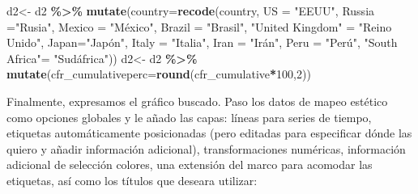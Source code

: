\documentclass[
]{article}
\newenvironment{Shaded}{\begin{snugshade}}{\end{snugshade}}
\newcommand{\AttributeTok}[1]{\textcolor[rgb]{0.13,0.29,0.53}{#1}}
\newcommand{\DecValTok}[1]{\textcolor[rgb]{0.00,0.00,0.81}{#1}}
\newcommand{\FunctionTok}[1]{\textcolor[rgb]{0.13,0.29,0.53}{\textbf{#1}}}
\newcommand{\NormalTok}[1]{#1}
\newcommand{\OtherTok}[1]{\textcolor[rgb]{0.56,0.35,0.01}{#1}}
\newcommand{\SpecialCharTok}[1]{\textcolor[rgb]{0.81,0.36,0.00}{\textbf{#1}}}
\newcommand{\StringTok}[1]{\textcolor[rgb]{0.31,0.60,0.02}{#1}}
\begin{document}
\begin{Shaded}
\begin{Highlighting}[]
\NormalTok{d2}\OtherTok{\textless{}{-}}\NormalTok{ d2 }\SpecialCharTok{\%\textgreater{}\%}
  \FunctionTok{mutate}\NormalTok{(}\AttributeTok{country=}\FunctionTok{recode}\NormalTok{(country, }\AttributeTok{US =} \StringTok{"EEUU"}\NormalTok{, }\AttributeTok{Russia =}\StringTok{"Rusia"}\NormalTok{, }\AttributeTok{Mexico =} \StringTok{"México"}\NormalTok{, }\AttributeTok{Brazil =} \StringTok{"Brasil"}\NormalTok{, }
                        \StringTok{"United Kingdom"} \OtherTok{=} \StringTok{"Reino Unido"}\NormalTok{, }\AttributeTok{Japan=}\StringTok{"Japón"}\NormalTok{,}
                        \AttributeTok{Italy =} \StringTok{"Italia"}\NormalTok{, }\AttributeTok{Iran =} \StringTok{"Irán"}\NormalTok{, }\AttributeTok{Peru =} \StringTok{"Perú"}\NormalTok{,}
                        \StringTok{"South Africa"}\OtherTok{=} \StringTok{"Sudáfrica"}\NormalTok{))}
\NormalTok{d2}\OtherTok{\textless{}{-}}\NormalTok{ d2 }\SpecialCharTok{\%\textgreater{}\%}
  \FunctionTok{mutate}\NormalTok{(}\AttributeTok{cfr\_cumulativeperc=}\FunctionTok{round}\NormalTok{(cfr\_cumulative}\SpecialCharTok{*}\DecValTok{100}\NormalTok{,}\DecValTok{2}\NormalTok{))}
\end{Highlighting}
\end{Shaded}

Finalmente, expresamos el gráfico buscado. Paso los datos de mapeo
estético como opciones globales y le añado las capas: líneas para series
de tiempo, etiquetas automáticamente posicionadas (pero editadas para
especificar dónde las quiero y añadir información adicional),
transformaciones numéricas, información adicional de selección colores,
una extensión del marco para acomodar las etiquetas, así como los
títulos que deseara utilizar:
\end{document}

